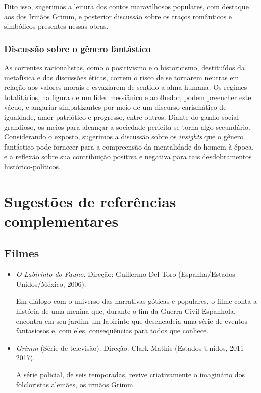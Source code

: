 \documentclass[12pt]{extarticle}
\begin{document}
Dito isso, sugerimos a leitura dos contos maravilhosos populares, com
destaque aos dos Irmãos Grimm, e posterior discussão sobre os traços
românticos e simbólicos presentes nessas obras.


\subsubsection{Discussão sobre o gênero fantástico}

As correntes racionalistas, como o positivismo e o historicismo,
destituídos da metafísica e das discussões éticas, correm o risco de
se tornarem neutras em relação aos valores morais e esvaziarem de
sentido a alma humana. Os regimes totalitários, na figura de um líder
messiânico e acolhedor, podem preencher este vácuo, e angariar
simpatizantes por meio de um discurso carismático de igualdade, amor
patriótico e progresso, entre outros. Diante do ganho social
grandioso, os meios para alcançar a sociedade perfeita se torna algo
secundário. Considerando o exposto, sugerimos a discussão sobre os
\textit{insights} que o gênero fantástico pode fornecer para a compreensão da
mentalidade do homem à época, e a reflexão sobre sua contribuição
positiva e negativa para tais desdobramentos histórico-políticos.

\section{Sugestões de referências complementares}\label{sugestoes}

\subsection{Filmes}

\begin{itemize}
\item \textit{O Labirinto do Fauno}. Direção: Guillermo Del Toro (Espanha/Estados Unidos/México, 2006).

Em diálogo com o universo das narrativas góticas e populares, o filme conta a história de uma menina 
que, durante o fim da Guerra Civil Espanhola, encontra em seu jardim um labirinto que desencadeia 
uma série de eventos fantasiosos e, com eles, consequências para todos que conhece.

\item \textit{Grimm} (Série de televisão). Direção: Clark Mathis (Estados Unidos, 2011--2017).

A série policial, de seis temporadas, revive criativamente o imaginário dos folcloristas alemães, 
os irmãos Grimm.
\end{itemize}
\end{document}
